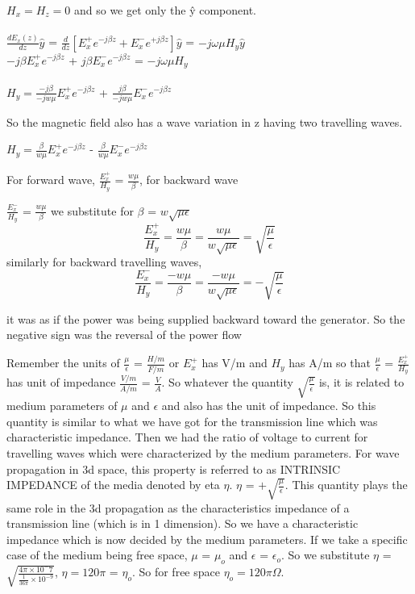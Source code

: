 $H_x = H_z = 0$ and so we get only the \^{y} component.\\
\\
$\frac{dE_x(z)}{dz}\hat{y}$ = $\frac{d}{dz}[E_x^+e^{-j\beta z} + E_x^-e^{+j\beta z}]\hat{y}$ = $-j\omega\mu H_y\hat{y}$\\

$-j\beta E_x^+e^{-j\beta z}$ + $j\beta E_x^-e^{-j\beta z}$ = $-j\omega\mu H_y$\\
\\
$H_y = \frac{-j\beta}{-jw\mu}E_x^{+}e^{-j\beta z}$ + $\frac{j\beta}{-jw\mu}E_x^{-}e^{-j\beta z}$

So the magnetic field also has a wave variation in z having two travelling waves. 

$H_y = \frac{\beta}{w\mu}E_x^{+}e^{-j\beta z}$ - $\frac{\beta}{w\mu}E_x^{-}e^{-j\beta z}$

For forward wave, $\frac{E_x^+}{H_y}$ = $\frac{w\mu}{\beta}$, for backward wave 

$\frac{E_x^-}{H_y}$ = $\frac{w\mu}{\beta}$
we substitute for $\beta$ = $w\sqrt{\mu\epsilon}$
\begin{dmath*}
\frac{E_x^+}{H_y} = \frac{w\mu}{\beta} = \frac{w\mu}{w\sqrt{\mu\epsilon}} = {\sqrt{\frac{\mu}{\epsilon}}}
\end{dmath*}
similarly for backward travelling waves,
\begin{dmath*}
\frac{E_x^-}{H_y} = \frac{-w\mu}{\beta} = \frac{-w\mu}{w\sqrt{\mu\epsilon}} = {-\sqrt{\frac{\mu}{\epsilon}}}
\end{dmath*}

it was as if the power was being supplied backward toward the generator. So the negative sign was the reversal of the power flow

Remember the units of $\frac{\mu}{\epsilon}$ = $\frac{H/m}{F/m}$ or $E_x^+$ has V/m and $H_y$ has A/m so that $\frac{\mu}{\epsilon}$ = $\frac{E_x^+}{H_y}$ has unit of impedance $\frac{V/m}{A/m}$ = $\frac{V}{A}$. So whatever the quantity ${\sqrt{\frac{\mu}{\epsilon}}}$ is, it is related to medium parameters of $\mu$ and $\epsilon$ and also has the unit of impedance. So this quantity is similar to what we have got for the transmission line which was characteristic impedance. Then we had the ratio of voltage to current for travelling waves which were characterized by the medium parameters. For wave propagation in 3d space, this property is referred to as INTRINSIC IMPEDANCE of the media denoted by eta $\eta$. $\eta$ = ${+\sqrt{\frac{\mu}{\epsilon}}}$. This quantity plays the same role in the 3d propagation as the characteristics impedance of a transmission line (which is in 1 dimension). So we have a characteristic impedance which is now decided by the medium parameters. If we take a specific case of the medium being free space, $\mu$ = $\mu_{o}$ and $\epsilon$ = $\epsilon_{o}$. So we substitute $\eta$ =$\sqrt{\frac{4\pi \times 10^-7}{\frac{1}{36\pi} \times 10^{-9}}}$, $\eta = 120\pi$ = $\eta_{o}$. So for free space $\eta_{o} = 120\pi$$\Omega$.

